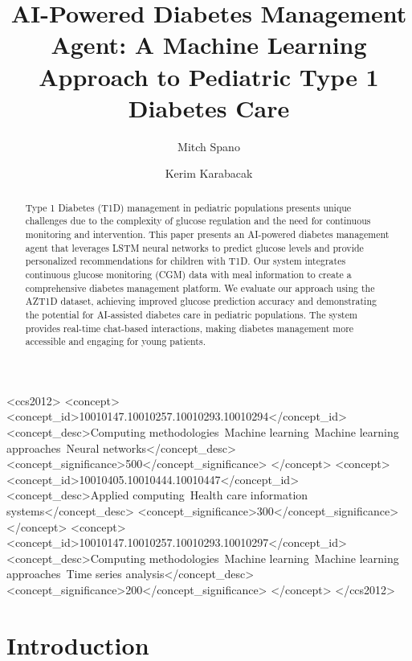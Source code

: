 \documentclass[acmsmall]{acmart}
\title{AI-Powered Diabetes Management Agent: A Machine Learning Approach to Pediatric Type 1 Diabetes Care}
\author{Mitch Spano}
\affiliation{%
  \institution{The University of Texas at Austin}
  \city{Austin}
  \state{Texas}
  \country{USA}
}
\author{Kerim Karabacak}
\affiliation{%
  \institution{The University of Texas at Austin}
  \city{Austin}
  \state{Texas}
  \country{USA}
}
\begin{document}
\begin{abstract}
  Type 1 Diabetes (T1D) management in pediatric populations presents unique challenges due to the complexity of glucose regulation and the need for continuous monitoring and intervention. This paper presents an AI-powered diabetes management agent that leverages LSTM neural networks to predict glucose levels and provide personalized recommendations for children with T1D. Our system integrates continuous glucose monitoring (CGM) data with meal information to create a comprehensive diabetes management platform. We evaluate our approach using the AZT1D dataset, achieving improved glucose prediction accuracy and demonstrating the potential for AI-assisted diabetes care in pediatric populations. The system provides real-time chat-based interactions, making diabetes management more accessible and engaging for young patients.
\end{abstract}

\begin{CCSXML}
  <ccs2012>
  <concept>
  <concept_id>10010147.10010257.10010293.10010294</concept_id>
  <concept_desc>Computing methodologies~Machine learning~Machine learning approaches~Neural networks</concept_desc>
  <concept_significance>500</concept_significance>
  </concept>
  <concept>
  <concept_id>10010405.10010444.10010447</concept_id>
  <concept_desc>Applied computing~Health care information systems</concept_desc>
  <concept_significance>300</concept_significance>
  </concept>
  <concept>
  <concept_id>10010147.10010257.10010293.10010297</concept_id>
  <concept_desc>Computing methodologies~Machine learning~Machine learning approaches~Time series analysis</concept_desc>
  <concept_significance>200</concept_significance>
  </concept>
  </ccs2012>
\end{CCSXML}



\maketitle

\section{Introduction}
\end{document}
